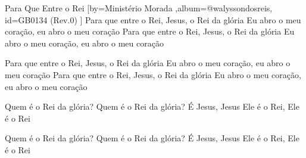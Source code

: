 \beginsong
{Para Que Entre o Rei %
}[by={Ministério Morada %
},album={@walyssondosreis},
id={GB0134 %
(Rev.0) %
}]
Para que entre o Rei, Jesus, o Rei da glória
Eu abro o meu coração, eu abro o meu coração
Para que entre o Rei, Jesus, o Rei da glória
Eu abro o meu coração, eu abro o meu coração

Para que entre o Rei, Jesus, o Rei da glória
Eu abro o meu coração, eu abro o meu coração
Para que entre o Rei, Jesus, o Rei da glória
Eu abro o meu coração, eu abro o meu coração

Quem é o Rei da glória?
Quem é o Rei da glória?
É Jesus, Jesus
Ele é o Rei, Ele é o Rei

Quem é o Rei da glória?
Quem é o Rei da glória?
É Jesus, Jesus
Ele é o Rei, Ele é o Rei


